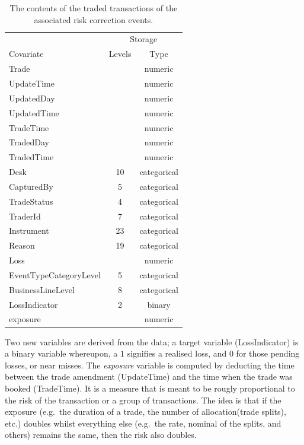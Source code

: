 \documentclass[]{article}
\begin{document}
\begin{table}[ht]
\centering
\caption{The contents of the traded transactions of the associated risk correction events.}
\begin{tabular}{lcc}
\toprule
  & \multicolumn{2}{c}{Storage} \\
Covariate     & Levels   & Type \\ 
\midrule
 Trade       &          & numeric \\
 UpdateTime  &          & numeric \\
 UpdatedDay  &          & numeric \\
 UpdatedTime &          & numeric \\
 TradeTime   &          & numeric \\
 TradedDay   &          & numeric \\
 TradedTime  &          & numeric \\
 Desk        &  10      & categorical \\
 CapturedBy  &  5       & categorical \\
 TradeStatus &  4       & categorical \\
 TraderId    &  7       & categorical \\
 Instrument  &  23      & categorical \\
 Reason      &  19      & categorical \\
 Loss        &          & numeric \\
 EventTypeCategoryLevel & 5  & categorical \\
 BusinessLineLevel      & 8  & categorical \\
 LossIndicator          & 2  & binary \\
 exposure               &    & numeric \\
 \bottomrule
\end{tabular}\label{tab_contents}
\end{table}

Two new variables are derived from the data; a target variable
(LossIndicator) is a binary variable whereupon, a \(1\) signifies a
realised loss, and \(0\) for those pending losses, or near misses. The
\emph{exposure} variable is computed by deducting the time between the
trade amendment (UpdateTime) and the time when the trade was booked
(TradeTime). It is a measure that is meant to be rougly proportional to
the risk of the transaction or a group of transactions. The idea is that
if the exposure (e.g.~the duration of a trade, the number of
allocation(trade splits), etc.) doubles whilst everything else (e.g.~the
rate, nominal of the splits, and others) remains the same, then the risk
also doubles.\medskip
\end{document}
